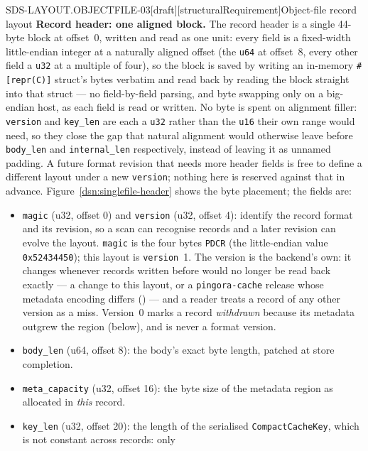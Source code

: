 \begin{requirement}{SDS-LAYOUT.OBJECTFILE-03}[draft][structuralRequirement]{Object-file record layout}
  \textbf{Record header: one aligned block.} The record header is a single
  44-byte block at offset~0, written and read as one unit: every field is a
  fixed-width little-endian integer at a naturally aligned offset (the
  \texttt{u64} at offset~8, every other field a \texttt{u32} at a multiple
  of four), so the block is saved by writing an
  in-memory \texttt{\#[repr(C)]} struct's bytes verbatim and read back by
  reading the block straight into that struct --- no field-by-field parsing,
  and byte swapping only on a big-endian host, as each field is read or
  written. No byte is spent on
  alignment filler: \texttt{version} and \texttt{key\_len} are each a
  \texttt{u32} rather than the \texttt{u16} their own range would need, so
  they close the gap that natural alignment would otherwise leave before
  \texttt{body\_len} and \texttt{internal\_len} respectively, instead of
  leaving it as unnamed padding. A future format revision that needs more
  header fields is free to define a different layout under a new
  \texttt{version}; nothing here is reserved against that in advance.
  Figure~\ref{dsn:singlefile-header} shows the byte placement; the fields are:
  \begin{itemize}
    \item \texttt{magic} (u32, offset 0) and \texttt{version} (u32, offset 4):
      identify the record format and its revision, so a scan can recognise
      records and a later revision can evolve the layout. \texttt{magic} is
      the four bytes \texttt{PDCR} (the little-endian value
      \texttt{0x52434450}); this layout is \texttt{version}~1. The version is
      the backend's own: it changes whenever records written before would no
      longer be read back exactly --- a change to this layout, or a
      \texttt{pingora-cache} release whose metadata encoding differs
      () --- and a reader treats a record
      of any other version as a miss. Version~0 marks a record
      \emph{withdrawn} because its metadata outgrew the region (below), and
      is never a format version.
    \item \texttt{body\_len} (u64, offset 8): the body's exact byte length,
      patched at store completion.
    \item \texttt{meta\_capacity} (u32, offset 16): the byte size of the
      metadata region as allocated in \emph{this} record.
    \item \texttt{key\_len} (u32, offset 20): the length of the serialised
      \texttt{CompactCacheKey}, which is not constant across records: only

\end{itemize}
\end{requirement}
